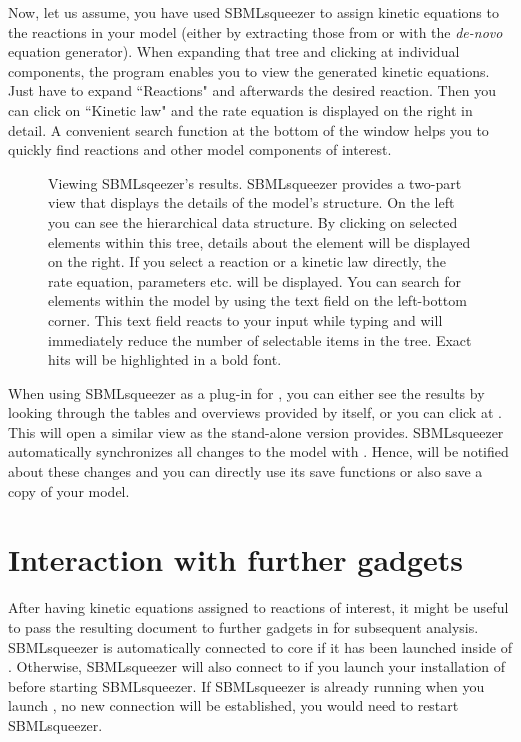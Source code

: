 Now, let us assume, you have used SBMLsqueezer to assign kinetic equations to the reactions in your model (either by extracting those from \SABIO or with the \emph{de-novo} equation generator).
When expanding that tree and clicking at individual components, the program enables you to view the generated kinetic equations.
Just have to expand ``Reactions" and afterwards the desired reaction.
Then you can click on ``Kinetic law" and the rate equation is displayed on the right in detail.
A convenient search function at the bottom of the window helps you to quickly find reactions and other model components of interest.
\begin{figure}[b!]
\caption[Viewing SBMLsqeezer's results]{Viewing SBMLsqeezer's results.
SBMLsqueezer provides a two-part view that displays the details of the model's structure.
On the left you can see the hierarchical \SBML data structure.
By clicking on selected elements within this tree, details about the element will be displayed on the right.
If you select a reaction or a kinetic law directly, the rate equation, parameters etc. will be displayed.
You can search for elements within the model by using the text field on the left-bottom corner.
This text field reacts to your input while typing and will immediately reduce the number of selectable items in the tree.
Exact hits will be highlighted in a bold font.}
\label{fig:Viewing_Results}
\end{figure}

When using SBMLsqueezer as a plug-in for \CellDesigner, you can either see the results by looking through the tables and overviews provided by \CellDesigner itself, or you can click at . This will open a similar view as the stand-alone version provides.
SBMLsqueezer automatically synchronizes all changes to the model with \CellDesigner.
Hence, \CellDesigner will be notified about these changes and you can directly use its save functions or also save a copy of your model.

\section{Interaction with further \Garuda gadgets}

After having kinetic equations assigned to reactions of interest, it might be useful to pass the resulting \SBML document to further gadgets in \Garuda for subsequent analysis.
SBMLsqueezer is automatically connected to \Garuda core if it has been launched inside of \Garuda.
Otherwise, SBMLsqueezer will also connect to \Garuda if you launch your installation of \Garuda before starting SBMLsqueezer.
If SBMLsqueezer is already running when you launch \Garuda, no new connection will be established, you would need to restart SBMLsqueezer.

